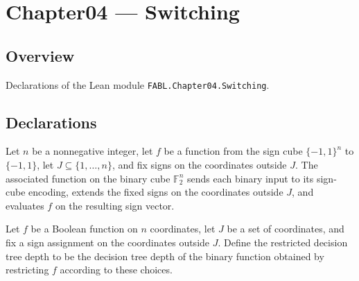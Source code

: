 \chapter{Chapter04 — Switching}
\section{Overview}

Declarations of the Lean module \texttt{FABL.Chapter04.Switching}.

\section{Declarations}

\begin{definition}
\label{FABL.restrictedBinaryFunction}
\leanok
{}
Let $n$ be a nonnegative integer, let $f$ be a function from the sign cube
$\{−1,1\}^n$ to $\{−1,1\}$, let $J\subseteq\{1,\ldots,n\}$, and fix signs on the
coordinates outside $J$. The associated function on the binary cube $\mathbb F_2^n$
sends each binary input to its sign-cube encoding, extends the fixed signs on the
coordinates outside $J$, and evaluates $f$ on the resulting sign vector.
\end{definition}

\begin{definition}
\label{FABL.restrictedDecisionTreeDepth}
\leanok
{}
Let $f$ be a Boolean function on $n$ coordinates, let $J$ be a set of coordinates, and
fix a sign assignment on the coordinates outside $J$. Define the restricted decision
tree depth to be the decision tree depth of the binary function obtained by restricting
$f$ according to these choices.
\end{definition}

